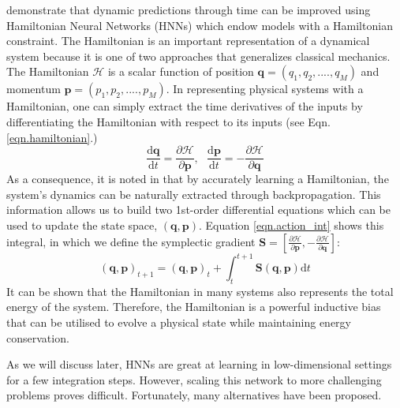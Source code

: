 \documentclass{article}
\begin{document}
\cite{greydanus_hamiltonian_2019} demonstrate that dynamic predictions through time can be improved using Hamiltonian Neural Networks (HNNs) which endow models with a Hamiltonian constraint. The Hamiltonian is an important representation of a dynamical system because it is one of two approaches that generalizes classical mechanics. The Hamiltonian $\mathcal{H}$ is a scalar function of position $\mathbf{q} = (q_1,q_2,....,q_M)$ and momentum $\mathbf{p} = (p_1,p_2,....,p_M)$. In representing physical systems with a Hamiltonian, one can simply extract the time derivatives of the inputs by differentiating the Hamiltonian with respect to its inputs (see Eqn. \ref{eqn.hamiltonian}.)
\begin{equation}
\frac{\mathrm{d}\mathbf{q}}{\mathrm{d}t} = \frac{\partial \mathcal{H}}{\partial \mathbf{p}}, ~~~
\frac{\mathrm{d}\mathbf{p}}{\mathrm{d}t} = -\frac{\partial \mathcal{H}}{\partial \mathbf{q}}
\label{eqn.hamiltonian}
\end{equation}
As a consequence, it is noted in \cite{greydanus_hamiltonian_2019} that by accurately learning a Hamiltonian, the system's dynamics can be naturally extracted through backpropagation. This information allows us to build two 1st-order differential equations which can be used to update the state space, $(\mathbf{q},\mathbf{p})$. Equation \ref{eqn.action_int} shows this integral, in which we define the symplectic gradient $\mathbf{S}  = \left [ \frac{\partial \mathcal{H}}{\partial \mathbf{p}},-\frac{\partial \mathcal{H}}{\partial \mathbf{q}} \right ] $:
\begin{equation}
(\mathbf{q},\mathbf{p})_{t+1} = (\mathbf{q},\mathbf{p})_t + \int_t^{t+1} \mathbf{S}(\mathbf{q},\mathbf{p}) \mathrm{d}t
\label{eqn.action_int}
\end{equation}
It can be shown that the Hamiltonian in many systems also represents the total energy of the system. Therefore, the Hamiltonian is a powerful inductive bias that can be utilised to evolve a physical state while maintaining energy conservation.

As we will discuss later, HNNs are great at learning in low-dimensional settings for a few integration steps. However, scaling this network to more challenging problems proves difficult. Fortunately, many alternatives have been proposed. 
\end{document}

